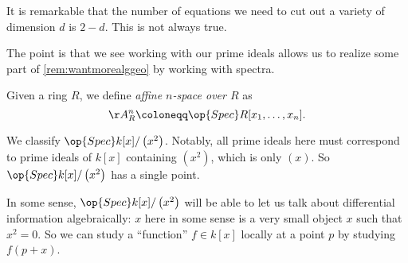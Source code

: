\documentclass[../notes.tex]{subfiles}
\begin{document}
\begin{remark}
	It is remarkable that the number of equations we need to cut out a variety of dimension $d$ is $2-d$. This is not always true.
\end{remark}
The point is that we see working with our prime ideals allows us to realize some part of \autoref{rem:wantmorealggeo} by working with spectra.
\begin{definition}
	Given a ring $R$, we define \textit{affine $n$-space over $R$} as
	\[\AA^n_R\coloneqq\op{Spec}R[x_1,\ldots,x_n].\]
\end{definition}
\begin{example}
	We classify $\op{Spec}k[x]/\left(x^2\right)$. Notably, all prime ideals here must correspond to prime ideals of $k[x]$ containing $\left(x^2\right)$, which is only $(x)$. So $\op{Spec}k[x]/\left(x^2\right)$ has a single point.
\end{example}
\begin{remark}
	In some sense, $\op{Spec}k[x]/\left(x^2\right)$ will be able to let us talk about differential information algebraically: $x$ here in some sense is a very small object $x$ such that $x^2=0$. So we can study a ``function'' $f\in k[x]$ locally at a point $p$ by studying $f(p+x)$.
\end{remark}
\end{document}
